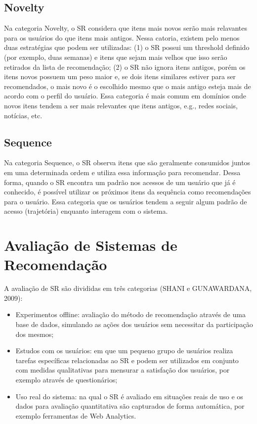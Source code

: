 \subsection{Novelty}

Na categoria Novelty, o SR considera que itens mais novos serão mais relavantes para os usuários do que itens mais antigos. Nessa catoria, existem pelo menos duas estratégias que podem ser utilizadas: (1) o SR possui um threshold definido (por exemplo, duas semanas) e itens que sejam mais velhos que isso serão retirados da lista de recomendação; (2) o SR não ignora itens antigos, porém os itens novos possuem um peso maior e, se dois itens similares estiver para ser recomendados, o mais novo é o escolhido mesmo que o mais antigo esteja mais de acordo com o perfil do usuário. Essa categoria é mais comum em domínios onde novos itens tendem a ser mais relevantes que itens antigos, e.g., redes sociais, notícias, etc.

\subsection{Sequence}

Na categoria Sequence, o SR observa itens que são geralmente consumidos juntos em uma determinada ordem e utiliza essa informação para recomendar. Dessa forma, quando o SR encontra um padrão nos acessos de um usuário que já é conhecido, é possível utilizar os próximos itens da sequência como recomendações para o usuário. Essa categoria que os usuários tendem a seguir algum padrão de acesso (trajetória) enquanto interagem com o sistema.

\section{Avaliação de Sistemas de Recomendação}

A avaliação de SR são divididas em três categorias (SHANI e GUNAWARDANA, 2009):

\begin{itemize}
\item Experimentos offline: avaliação do método de recomendação através de uma base de dados, simulando as ações dos usuários sem necessitar da participação dos mesmos;
\item Estudos com os usuários: em que um pequeno grupo de usuários realiza tarefas específicas relacionadas ao SR e podem ser utilizados em conjunto com medidas qualitativas para mensurar a satisfação dos usuários, por exemplo através de questionários;
\item Uso real do sistema: na qual o SR é avaliado em situações reais de uso e os dados para avaliação quantitativa são capturados de forma automática, por exemplo ferramentas de Web Analytics.
\end{itemize}

